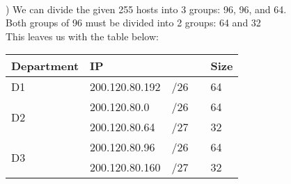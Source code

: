 \documentclass[12pt]{article}
\begin{document}
\hrulefill \\
\pagebreak


) We can divide the given 255 hosts into 3 groups: 96, 96, and 64.\\
\indent  Both groups of 96 must be divided into 2 groups: 64 and 32\\
\indent  This leaves us with the table below:\\


\begin{table}[h!]
\centering
\begin{tabular}{@{}lllll@{}}
\toprule
 	   Department  & IP &&&Size\\ \midrule
 	   	      D1   & 200.120.80.192 & /26 && 64\\[.4em]
\multirow{2}{*}{D2} & 200.120.80.0 & /26 && 64\\
			  & 200.120.80.64 & /27 && 32\\[.4em]
\multirow{2}{*}{D3} & 200.120.80.96 & /26 && 64\\
			  & 200.120.80.160 & /27 && 32\\ \bottomrule

\end{tabular}
\end{table}
\end{document}

